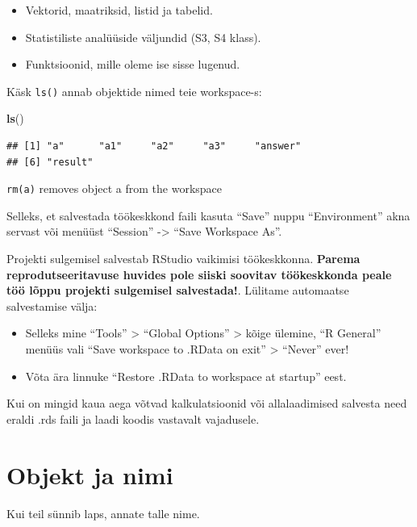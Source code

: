 \documentclass[]{book}
\newenvironment{Shaded}{\begin{snugshade}}{\end{snugshade}}
\newcommand{\KeywordTok}[1]{\textcolor[rgb]{0.13,0.29,0.53}{\textbf{#1}}}
\newcommand{\NormalTok}[1]{#1}
\providecommand{\tightlist}{%
  \setlength{\itemsep}{0pt}\setlength{\parskip}{0pt}}
\begin{document}
\begin{itemize}
\tightlist
\item
  Vektorid, maatriksid, listid ja tabelid.
\item
  Statistiliste analüüside väljundid (S3, S4 klass).
\item
  Funktsioonid, mille oleme ise sisse lugenud.
\end{itemize}

Käsk \texttt{ls()} annab objektide nimed teie workspace-s:

\begin{Shaded}
\begin{Highlighting}[]
\KeywordTok{ls}\NormalTok{()}
\end{Highlighting}
\end{Shaded}

\begin{verbatim}
## [1] "a"      "a1"     "a2"     "a3"     "answer"
## [6] "result"
\end{verbatim}

\texttt{rm(a)} removes object a from the workspace

Selleks, et salvestada töökeskkond faili kasuta ``Save'' nuppu
``Environment'' akna servast või menüüst ``Session'' -\textgreater{}
``Save Workspace As''.

Projekti sulgemisel salvestab RStudio vaikimisi töökeskkonna.
\textbf{Parema reprodutseeritavuse huvides pole siiski soovitav
töökeskkonda peale töö lõppu projekti sulgemisel salvestada!}. Lülitame
automaatse salvestamise välja:

\begin{itemize}
\tightlist
\item
  Selleks mine ``Tools'' \textgreater{} ``Global Options''
  \textgreater{} kõige ülemine, ``R General'' menüüs vali ``Save
  workspace to .RData on exit'' \textgreater{} ``Never'' ever!
\item
  Võta ära linnuke ``Restore .RData to workspace at startup'' eest.
\end{itemize}

Kui on mingid kaua aega võtvad kalkulatsioonid või allalaadimised
salvesta need eraldi .rds faili ja laadi koodis vastavalt vajadusele.

\section{Objekt ja nimi}\label{objekt-ja-nimi}

Kui teil sünnib laps, annate talle nime.
\end{document}

